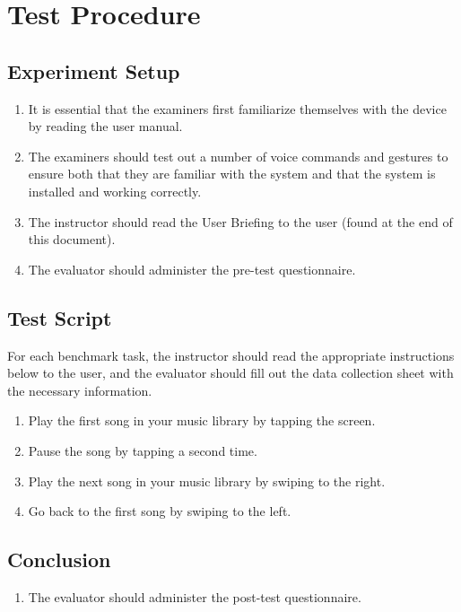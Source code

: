 \documentclass[12pt,letterpaper]{article}
\begin{document}
\section{Test Procedure}

\subsection{Experiment Setup}

\begin{enumerate}
\item It is essential that the examiners first familiarize themselves with the device by reading the user manual.
\item The examiners should test out a number of voice commands and gestures to ensure both that they are familiar with the system and that the system is installed and working correctly.
\item The instructor should read the User Briefing to the user (found at the end of this document).
\item The evaluator should administer the pre-test questionnaire.
\end{enumerate}

\subsection{Test Script}

For each benchmark task, the instructor should read the appropriate instructions below to the user, and the evaluator should fill out the data collection sheet with the necessary information.

\begin{enumerate}
\item Play the first song in your music library by tapping the screen.
\item Pause the song by tapping a second time.
\item Play the next song in your music library by swiping to the right.
\item Go back to the first song by swiping to the left.

\end{enumerate}

\subsection{Conclusion}

\begin{enumerate}
\item The evaluator should administer the post-test questionnaire.
\end{enumerate}
\end{document}
